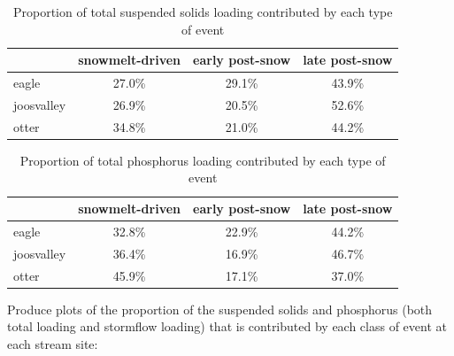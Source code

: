 \documentclass[12pt]{article}
\begin{document}
\begin{table}[h]
\begin{center}
\begin{tabular}{lccc}
  & snowmelt-driven & early post-snow & late post-snow \\ 
  \hline
eagle & 27.0\% & 29.1\% & 43.9\% \\ 
  joosvalley & 26.9\% & 20.5\% & 52.6\% \\ 
  otter & 34.8\% & 21.0\% & 44.2\% \\ 
  \end{tabular}
\caption{Proportion of total suspended solids loading contributed by each type of event}
\label{tab:stot}
\end{center}
\end{table}
\begin{table}[h]
\begin{center}
\begin{tabular}{lccc}
  & snowmelt-driven & early post-snow & late post-snow \\ 
  \hline
eagle & 32.8\% & 22.9\% & 44.2\% \\ 
  joosvalley & 36.4\% & 16.9\% & 46.7\% \\ 
  otter & 45.9\% & 17.1\% & 37.0\% \\ 
  \end{tabular}
\caption{Proportion of total phosphorus loading contributed by each type of event}
\label{tab:ptot}
\end{center}
\end{table}










Produce plots of the proportion of the suspended solids and phosphorus (both total loading and stormflow loading) that is contributed by each class of event at each stream site:\\
\end{document}
